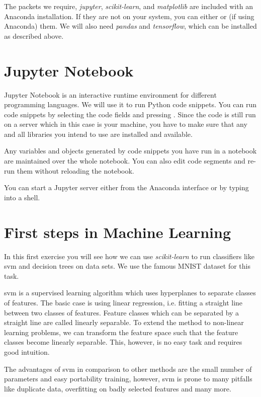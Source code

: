 \documentclass[parskip=half,notes,cadrem,toolver]{iisvlsi}
\begin{document}
The packets we require, \textit{jupyter}, \textit{scikit-learn}, and \textit{matplotlib} are included with an Anaconda installation. If they are not on your system, you can either  or (if using Anaconda)  them. We will also need \textit{pandas} and \textit{tensorflow}, which can be installed as described above. 
\section{Jupyter Notebook}

Jupyter Notebook is an interactive runtime environment for different programming languages. We will use it to run Python code snippets. You can run code snippets by selecting the code fields and pressing . Since the code is still run on a server which in this case is your machine, you have to make sure that any and all libraries you intend to use are installed and available.

Any variables and objects generated by code snippets you have run in a notebook are maintained over the whole notebook. You can also edit code segments and re-run them without reloading the notebook.

You can start a Jupyter server either from the Anaconda interface or by typing  into a shell.

\section{First steps in Machine Learning}

In this first exercise you will see how we can use \textit{scikit-learn} to run classifiers like \gls{svm} and decision trees on data sets. We use the famous MNIST dataset for this task. 

\gls{svm} is a supervised learning algorithm which uses hyperplanes to separate classes of features. The basic case is using linear regression, i.e. fitting a straight line between two classes of features. Feature classes which can be separated by a straight line are called linearly separable.
To extend the method to non-linear learning problems, we can transform the feature space such that the feature classes become linearly separable. This, however, is no easy task and requires good intuition.

The advantages of \gls{svm} in comparison to other methods are the small number of parameters and easy portability training, however, \gls{svm} is prone to many pitfalls like duplicate data, overfitting on badly selected features and many more. 
\end{document}
